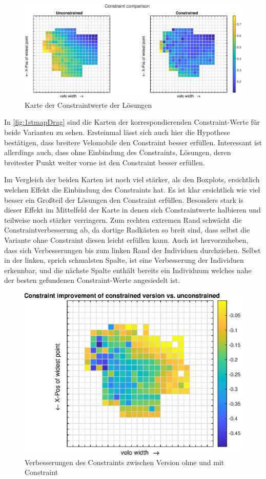 \begin{figure}[h]
	\includegraphics[width=1\linewidth]{bilder/2pt500Samples/constraintMapComparison}
	\caption{Karte der Constraintwerte der Lösungen}
	\label{fig:1stmapCon}
\end{figure}

In  \cref{fig:1stmapDrag} sind die Karten der korrespondierenden Constraint-Werte für beide Varianten zu sehen.
Ersteinmal lässt sich auch hier die Hypothese bestätigen, dass breitere Velomobile den Constraint besser erfüllen.
Interessant ist allerdings auch, dass ohne Einbindung des Constraints, Lösungen, deren breitester Punkt weiter vorne ist den Constraint besser erfüllen.

Im Vergleich der beiden Karten ist noch viel stärker, als den Boxplots, ersichtlich welchen Effekt die Einbindung des Constraints hat.
Es ist klar ersichtlich wie viel besser ein Großteil der Lösungen den Constraint erfüllen.
Besonders stark is dieser Effekt im Mittelfeld der Karte in denen sich Constraintwerte halbieren und teilweise noch stärker verringern.
Zum rechten extremen Rand schwächt die Constraintverbesserung ab, da dortige Radkästen so breit sind, dass selbst die Variante ohne Constraint diesen leicht erfüllen kann.
Auch ist hervorzuheben, dass sich Verbesserungen bis zum linken Rand der Individuen durchziehen.
Selbst in der linken, sprich schmalsten Spalte, ist eine Verbesserung der Individuen erkennbar, und die nächste Spalte enthält bereits ein Individuum welches nahe der besten gefundenen Constraint-Werte angesiedelt ist.

\begin{figure}[h]
	\centering
	\includegraphics[width=.7\linewidth]{bilder/2pt500Samples/constraintImprovements}
	\caption{Verbesserungen des Constraints zwischen Version ohne und mit Constraint}
	\label{fig:1stmapConCompare}
\end{figure}

